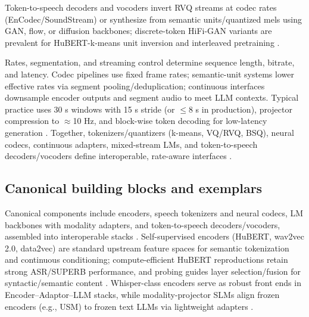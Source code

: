 \documentclass{article}
\begin{document}
Token-to-speech decoders and vocoders invert RVQ streams at codec rates (EnCodec/SoundStream) or synthesize from semantic units/quantized mels using GAN, flow, or diffusion backbones; discrete-token HiFi-GAN variants are prevalent for HuBERT-k-means unit inversion and interleaved pretraining \cite{wang2025tadicodectextawarediffusionspeechtokeniz,zeng2024scalingspeechtextpretrainingsyntheticint}.

Rates, segmentation, and streaming control determine sequence length, bitrate, and latency. Codec pipelines use fixed frame rates; semantic-unit systems lower effective rates via segment pooling/deduplication; continuous interfaces downsample encoder outputs and segment audio to meet LLM contexts. Typical practice uses 30 s windows with 15 s stride (or $\le$8 s in production), projector compression to $\approx$10 Hz, and block-wise token decoding for low-latency generation \cite{nguyen2025qwenvsgemmaintegrationwhispercomparative,li2025seewossubmissionmlcslmlessonslearnedspee,zeng2024scalingspeechtextpretrainingsyntheticint}. Together, tokenizers/quantizers (k-means, VQ/RVQ, BSQ), neural codecs, continuous adapters, mixed-stream LMs, and token-to-speech decoders/vocoders define interoperable, rate-aware interfaces \cite{guo2025recentadvancesdiscretespeechtokensreview}.

\subsection{Canonical building blocks and exemplars} \label{subsec:Canonical building blocks and exemplars}
Canonical components include encoders, speech tokenizers and neural codecs, LM backbones with modality adapters, and token-to-speech decoders/vocoders, assembled into interoperable stacks \cite{guo2025recentadvancesdiscretespeechtokensreview}. Self-supervised encoders (HuBERT, wav2vec 2.0, data2vec) are standard upstream feature spaces for semantic tokenization and continuous conditioning; compute-efficient HuBERT reproductions retain strong ASR/SUPERB performance, and probing guides layer selection/fusion for syntactic/semantic content \cite{chen2023reducingbarriersselfsupervisedlearninghu,shen2023wavesyntaxprobingspokenlanguagemodels}. Whisper-class encoders serve as robust front ends in Encoder--Adaptor--LLM stacks, while modality-projector SLMs align frozen encoders (e.g., USM) to frozen text LLMs via lightweight adapters \cite{wang2023slmbridgethingapbetweenspeechtextfoundat,nguyen2025qwenvsgemmaintegrationwhispercomparative,guo2025recentadvancesdiscretespeechtokensreview}.
\end{document}
